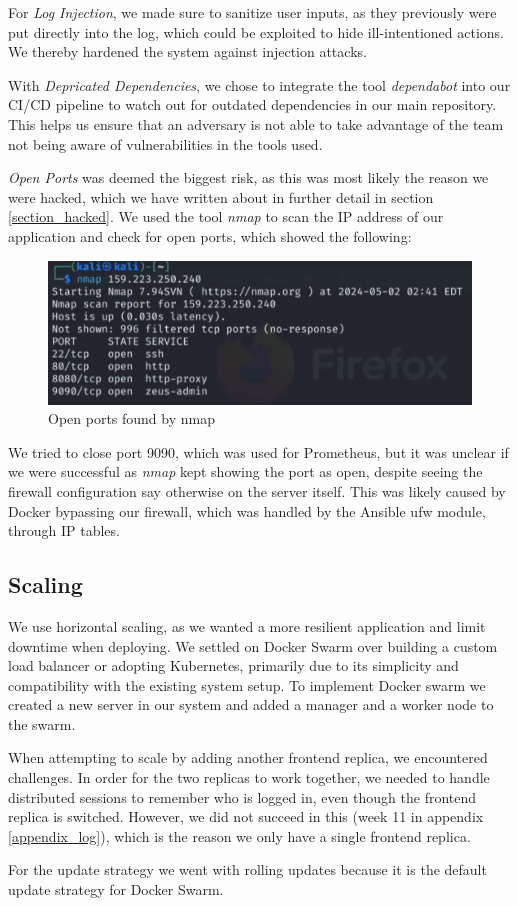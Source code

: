 For \textit{Log Injection}, we made sure to sanitize user inputs, as they previously were put directly into the log, which could be exploited to hide ill-intentioned actions. We thereby hardened the system against injection attacks.

With \textit{Depricated Dependencies}, we chose to integrate the tool \textit{dependabot} into our CI/CD pipeline to watch out for outdated dependencies in our main repository. This helps us ensure that an adversary is not able to take advantage of the team not being aware of vulnerabilities in the tools used.

\textit{Open Ports} was deemed the biggest risk, as this was most likely the reason we were hacked, which we have written about in further detail in section \ref{section_hacked}. We used the tool \textit{nmap} to scan the IP address of our application and check for open ports, which showed the following:
\begin{figure}[H]
    \centering
    \includegraphics[width=1\linewidth]{images/nmap.png}
    \caption{Open ports found by nmap}
    \label{fig:matrix}
\end{figure}
We tried to close port 9090, which was used for Prometheus, but it was unclear if we were successful as \textit{nmap} kept showing the port as open, despite seeing the firewall configuration say otherwise on the server itself. This was likely caused by Docker bypassing our firewall, which was handled by the Ansible ufw module, through IP tables.

\subsection{Scaling}
We use horizontal scaling, as we wanted a more resilient application and limit downtime when deploying. We settled on Docker Swarm over building a custom load balancer or adopting Kubernetes, primarily due to its simplicity and compatibility with the existing system setup. To implement Docker swarm we created a new server in our system and added a manager and a worker node to the swarm.

When attempting to scale by adding another frontend replica, we encountered challenges. In order for the two replicas to work together, we needed to handle distributed sessions to remember who is logged in, even though the frontend replica is switched. However, we did not succeed in this (week 11 in appendix \ref{appendix_log}), which is the reason we only have a single frontend replica.

For the update strategy we went with rolling updates because it is the default update strategy for Docker Swarm.
